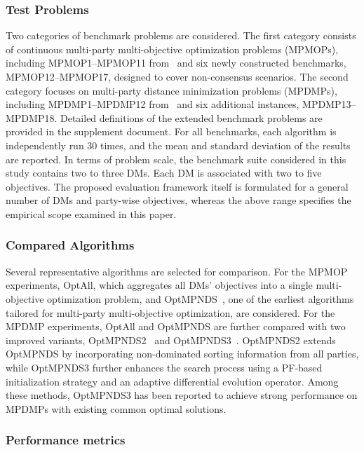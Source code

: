 \documentclass[journal]{IEEEtran}
\begin{document}
\subsubsection{Test Problems}

Two categories of benchmark problems are considered. The first category consists of continuous multi-party multi-objective optimization problems (MPMOPs), including MPMOP1--MPMOP11 from~\cite{liu2020evolutionary} and six newly constructed benchmarks, MPMOP12--MPMOP17, designed to cover non-consensus scenarios. The second category focuses on multi-party distance minimization problems (MPDMPs), including MPDMP1--MPDMP12 from~\cite{she2023multiparty} and six additional instances, MPDMP13--MPDMP18. Detailed definitions of the extended benchmark problems are provided in the supplement document. For all benchmarks, each algorithm is independently run 30 times, and the mean and standard deviation of the results are reported. In terms of problem scale, the benchmark suite considered in this study contains two to three DMs. Each DM is associated with two to five objectives. The proposed evaluation framework itself is formulated for a general number of DMs and party-wise objectives, whereas the above range specifies the empirical scope examined in this paper.

\subsubsection{Compared Algorithms}

Several representative algorithms are selected for comparison.
For the MPMOP experiments, OptAll, which aggregates all DMs' objectives into a single multi-objective optimization problem, and OptMPNDS~\cite{liu2020evolutionary}, one of the earliest algorithms tailored for multi-party multi-objective optimization, are considered. For the MPDMP experiments, OptAll and OptMPNDS are further compared with two improved variants, OptMPNDS2~\cite{she2021new} and OptMPNDS3~\cite{she2023multiparty}. OptMPNDS2 extends OptMPNDS by incorporating non-dominated sorting information from all parties, while OptMPNDS3 further enhances the search process using a PF-based initialization strategy and an adaptive differential evolution operator. Among these methods, OptMPNDS3 has been reported to achieve strong performance on MPDMPs with existing common optimal solutions.

\subsubsection{Performance metrics}
\end{document}
